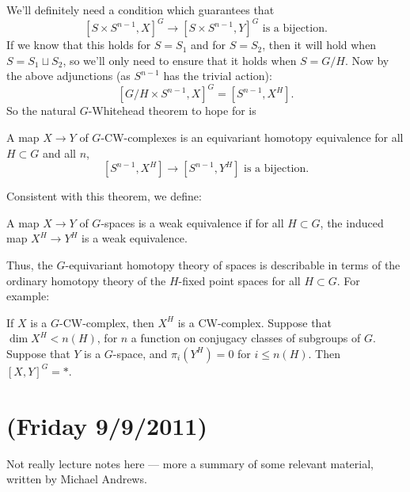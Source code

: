 \documentclass[11pt]{article}
\newcommand{\NewLecture}[3]{\section{#1 {\small(#2/#3/2011)}}}
\begin{document}
\begin{FirstNineLectures}
We'll definitely need a condition which guarantees that
\[[S\times S^{n-1},X]^G\to[S\times S^{n-1},Y]^G\text{\ \ is a bijection.}\]
If we know that this holds for $S=S_1$ and for $S=S_2$, then it will hold when $S=S_1\sqcup S_2$, so we'll only need to ensure that it holds when $S=G/H$. Now by the above adjunctions (as $S^{n-1}$ has the trivial action):
\[[G/H\times S^{n-1},X]^G=[S^{n-1},X^H].\]
So the natural $G$-Whitehead theorem to hope for is
\begin{thm*}
A map $X\to Y$ of $G$-CW-complexes is an equivariant homotopy equivalence \Iff for all $H\subset G$ and all $n$,
\[[S^{n-1},X^H]\to[S^{n-1},Y^H]\text{\ \ is a bijection}.\]
\end{thm*}
\noindent Consistent with this theorem, we define:
\begin{defn*}
A map $X\to Y$ of $G$-spaces is a weak equivalence if for all $H\subset G$, the induced map $X^H\to Y^H$ is a weak equivalence.
\end{defn*}
\noindent
Thus, the $G$-equivariant homotopy theory of spaces is describable in terms of the ordinary homotopy theory of the $H$-fixed point spaces for all $H\subset G$.  For example:
\begin{thm*}
If $X$ is a $G$-CW-complex, then $X^H$ is a CW-complex. Suppose that $\dim X^H<n(H)$, for $n$ a function on conjugacy classes of subgroups of $G$. Suppose that $Y$ is a $G$-space, and $\pi_i(Y^H)=0$ for $i\leq n(H)$. Then $[X,Y]^G=*$.
\end{thm*}
\NewLecture{}{Friday 9}{9}
Not really lecture notes here --- more a summary of some relevant material, written by Michael Andrews.

\end{FirstNineLectures}
\end{document}
